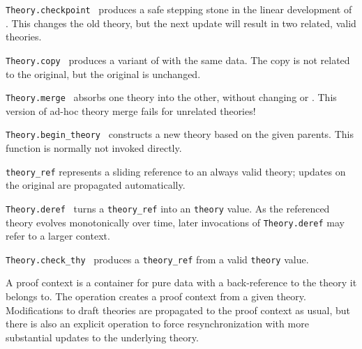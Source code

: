 \begin{isabellebody}
\begin{isamarkuptext}
\begin{description}
  \item \verb|Theory.checkpoint|~ produces a safe
  stepping stone in the linear development of .  This
  changes the old theory, but the next update will result in two
  related, valid theories.

  \item \verb|Theory.copy|~ produces a variant of  with the same data.  The copy is not related to the original,
  but the original is unchanged.

  \item \verb|Theory.merge|~ absorbs one theory
  into the other, without changing  or .
  This version of ad-hoc theory merge fails for unrelated theories!

  \item \verb|Theory.begin_theory|~ constructs
  a new theory based on the given parents.  This {\ML} function is
  normally not invoked directly.

  \item \verb|theory_ref| represents a sliding reference to an
  always valid theory; updates on the original are propagated
  automatically.

  \item \verb|Theory.deref|~ turns a \verb|theory_ref| into an \verb|theory| value.  As the referenced
  theory evolves monotonically over time, later invocations of \verb|Theory.deref| may refer to a larger context.

  \item \verb|Theory.check_thy|~ produces a \verb|theory_ref| from a valid \verb|theory| value.

  \end{description}%
\end{isamarkuptext}%
\isamarkuptrue%
%
\endisatagmlref
{\isafoldmlref}%
%
\isadelimmlref
%
\endisadelimmlref
%
\isamarkuptrue%
%
\begin{isamarkuptext}%
A proof context is a container for pure data with a
  back-reference to the theory it belongs to.  The 
  operation creates a proof context from a given theory.
  Modifications to draft theories are propagated to the proof context
  as usual, but there is also an explicit  operation
  to force resynchronization with more substantial updates to the
  underlying theory.


\end{isamarkuptext}
\end{isabellebody}

